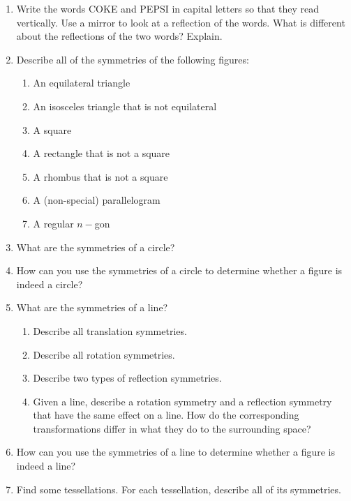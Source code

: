 \begin{problems}
\begin{enumerate}
\item Write the words COKE and PEPSI in capital letters so that they read vertically.  Use a mirror to look at a reflection of the words.  What is different about the reflections of the two words?  Explain.  

\item Describe all of the symmetries of the following figures: 
\begin{enumerate}
\item An equilateral triangle
\item An isosceles triangle that is not equilateral
\item A square
\item A rectangle that is not a square
\item A rhombus that is not a square
\item A (non-special) parallelogram
\item A regular $n-$gon
\end{enumerate}

\item What are the symmetries of a circle? 

\item How can you use the symmetries of a circle to determine whether a figure is indeed a circle?  

\item What are the symmetries of a line?  
\begin{enumerate}
\item Describe all translation symmetries.  
\item Describe all rotation symmetries.
\item Describe two types of reflection symmetries.
\item Given a line, describe a rotation symmetry and a reflection symmetry that have the same effect on a line.  How do the corresponding transformations differ in what they do to the surrounding space?  
\end{enumerate}

\item How can you use the symmetries of a line to determine whether a figure is indeed a line? 

\item Find some tessellations.  For each tessellation, describe all of its symmetries.  

\end{enumerate}

\end{problems}

